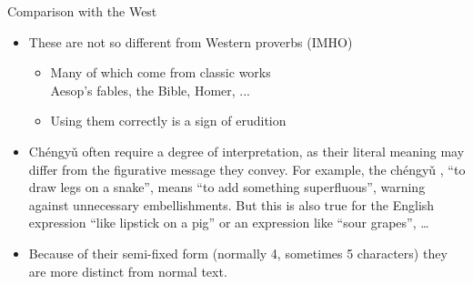 \documentclass[xetex]{beamer}
\newcommand{\zh}{\mtciteform}
\begin{document}
  
\begin{frame}{Comparison with the West}
  \begin{itemize}
  \item These are not so different from Western proverbs (IMHO)
    \begin{itemize}
    \item Many of which come from classic works
      \\ Aesop's fables, the Bible, Homer, ...
    \item Using them correctly is a sign of erudition
    \end{itemize}
  \item Chéngyǔ often require a degree of interpretation, as their
    literal meaning may differ from the figurative message they
    convey. For example, the chéngyǔ  \zh{huà shé tiān zú},
    ``to draw legs on a snake'', means ``to add something
    superfluous'', warning against unnecessary embellishments.  But this is also true for the English expression ``like lipstick on a pig'' or an expression like ``sour grapes'', \ldots
  \item Because of their semi-fixed form (normally 4, sometimes 5 characters) they are more distinct from normal text.
  \end{itemize}
\end{frame}
\end{document}
